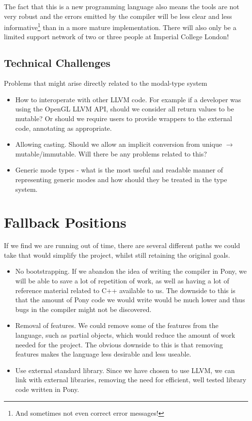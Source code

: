 \documentclass[11pt,a4paper]{report}
\begin{document}
The fact that this is a new programming language also means the tools are not very robust and the errors emitted by the compiler will be less clear and less informative\footnote{And sometimes not even correct error messages!} than in a more mature implementation.
There will also only be a limited support network of two or three people at Imperial College London!

\subsection{Technical Challenges}

Problems that might arise directly related to the modal-type system
	\begin{itemize}
		\item How to interoperate with other LLVM code. For example if a developer was using the OpenGL LLVM API, should we consider all return values to be mutable?
			Or should we require users to provide wrappers to the external code, annotating as appropriate.
		\item Allowing casting. Should we allow an implicit conversion from unique $\to$ mutable/immutable.
			Will there be any problems related to this?
		\item Generic mode types - what is the most useful and readable manner of representing generic modes and how should they be treated in the type system.
	\end{itemize}
	
\section{Fallback Positions}
If we find we are running out of time, there are several different paths we could take that would simplify the project, whilst still retaining the original goals.
\begin{itemize}[noitemsep]
\item No bootstrapping.
	If we abandon the idea of writing the compiler in Pony, we will be able to save a lot of repetition of work, as well as having a lot of reference material related to C++ available to us.
	The downside to this is that the amount of Pony code we would write would be much lower and thus bugs in the compiler might not be discovered.
\item Removal of features.
	We could remove some of the features from the language, such as partial objects, which would reduce the amount of work needed for the project.
	The obvious downside to this is that removing features makes the language less desirable and less useable.
\item Use external standard library.
	 Since we have chosen to use LLVM, we can link with external libraries, removing the need for efficient, well tested library code written in Pony.
\end{itemize}
\end{document}

